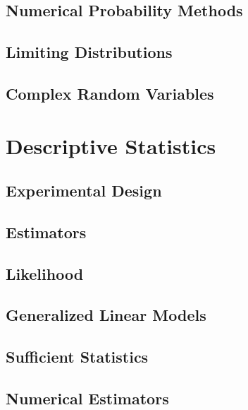 \documentclass[12pt]{book}
\theoremstyle{definition}
\begin{document}
\chapter{Numerical Probability Methods}


\chapter{Limiting Distributions}


\chapter{Complex Random Variables}


\part{Descriptive Statistics}

\chapter{Experimental Design}


\chapter{Estimators}


\chapter{Likelihood}


\chapter{Generalized Linear Models}


\chapter{Sufficient Statistics}


\chapter{Numerical Estimators}

\end{document}
